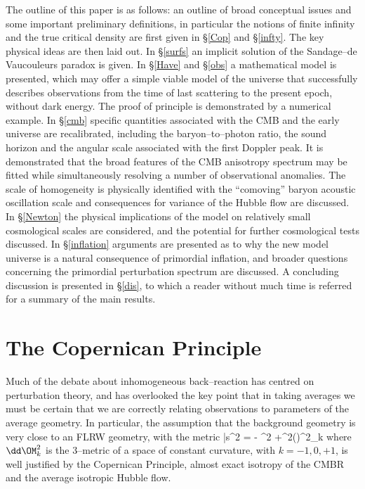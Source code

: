 \documentclass[12pt]{iopart}
\begin{document}
The outline of this paper is as follows: an outline of broad conceptual
issues and some important preliminary definitions, in particular the notions
of finite infinity and the true critical density are first given in
\S\ref{Cop} and \S\ref{infty}. The key physical ideas are then laid out.
In \S\ref{surfs} an implicit solution of the Sandage--de Vaucouleurs paradox
is given. In \S\ref{Have} and \S\ref{obs} a mathematical model is
presented, which may offer a simple viable model of the universe
that successfully describes observations from the time of last
scattering to the present epoch, without dark energy. The proof of
principle is demonstrated by a numerical example. In \S\ref{cmb}
specific quantities associated with the CMB and the early universe are
recalibrated, including the baryon--to--photon ratio, the sound horizon
and the angular scale associated with the first Doppler peak. It is
demonstrated that the broad features of the CMB anisotropy spectrum
may be fitted while simultaneously resolving a number of observational
anomalies. The scale of homogeneity is physically identified with the
``comoving'' baryon acoustic oscillation scale and consequences for variance of
the Hubble flow are discussed. In \S\ref{Newton}
the physical implications of the model on relatively small cosmological
scales are considered, and the potential for further cosmological tests
discussed. In \S\ref{inflation} arguments are presented as to why the
new model universe is a natural consequence of primordial inflation,
and broader questions concerning the
primordial perturbation spectrum are discussed. A concluding discussion
is presented in \S\ref{dis}, to which a reader without much time is referred
for a summary of the main results.

\section{The Copernican Principle\label{Cop}}

Much of the debate about inhomogeneous back--reaction has centred on
perturbation theory, and has overlooked the key point that in taking
averages we must be certain that we are correctly relating
observations to parameters of the average geometry. In particular,
the assumption that the background geometry is very close to an FLRW
geometry, with the metric
\beq\label{FLRW}
\dd\bar s^2 = - \dd\ts^2 +\ab^2(\ts)\dd\OM^2_{k}
\eeq
where $\dd\OM^2_{k}$ is the 3--metric of a space of constant curvature,
with $k=-1,0,+1$, is well justified by the Copernican Principle, almost
exact isotropy of the CMBR and the average isotropic Hubble flow.
\end{document}
